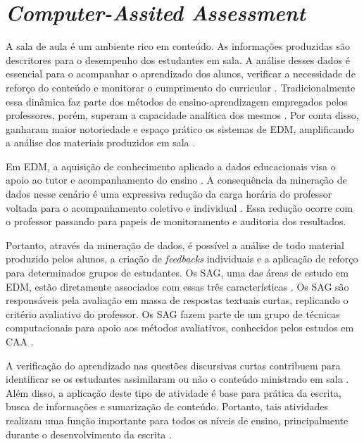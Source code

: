 \section{\textit{Computer-Assited Assessment}}

A sala de aula é um ambiente rico em conteúdo. As informações produzidas são descritores para o desempenho dos estudantes em sala. A análise desses dados é essencial para o acompanhar o aprendizado dos alunos, verificar a necessidade de reforço do conteúdo e monitorar o cumprimento do curricular \cite{sweta2021}. Tradicionalmente essa dinâmica faz parte dos métodos de ensino-aprendizagem empregados pelos professores, porém, superam a capacidade analítica dos mesmos \cite{madero2019}. Por conta disso, ganharam maior notoriedade e espaço prático os sistemas de EDM, amplificando a análise dos materiais produzidos em sala \cite{siemens2012, romero2010}.

Em EDM, a aquisição de conhecimento aplicado a dados educacionais visa o apoio ao tutor e acompanhamento do ensino \cite{ferreira-mello2019}. A consequência da mineração de dados nesse cenário é uma expressiva redução da carga horária do professor voltada para o acompanhamento coletivo e individual \cite{sweta2021}. Essa redução ocorre com o professor passando para papeis de monitoramento e auditoria dos resultados.

Portanto, através da mineração de dados, é possível a análise de todo material produzido pelos alunos, a criação de \textit{feedbacks} individuais e a aplicação de reforço para determinados grupos de estudantes. Os SAG, uma das áreas de estudo em EDM, estão diretamente associados com essas três características \cite{burrows2015}. Os SAG são responsáveis pela avaliação em massa de respostas textuais curtas, replicando o critério avaliativo do professor. Os SAG fazem parte de um grupo de técnicas computacionais para apoio aos métodos avaliativos, conhecidos pelos estudos em CAA \cite{perez-marin2009}.

A verificação do aprendizado nas questões discursivas curtas contribuem para identificar se os estudantes assimilaram ou não o conteúdo ministrado em sala \cite{oliveira2013}. Além disso, a aplicação deste tipo de atividade é base para prática da escrita, busca de informações e sumarização de conteúdo. Portanto, tais atividades realizam uma função importante para todos os níveis de ensino, principalmente durante o desenvolvimento da escrita \cite{johnstone2002}. 

